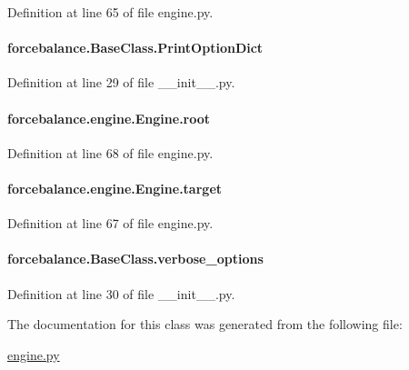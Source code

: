 Definition at line 65 of file engine.\-py.

\hypertarget{classforcebalance_1_1BaseClass_afc6659278497d7245bc492ecf405ccae}{
\paragraph[{Print\-Option\-Dict}]{\setlength{\rightskip}{0pt plus 5cm}forcebalance.\-Base\-Class.\-Print\-Option\-Dict\hspace{0.3cm}{\ttfamily [inherited]}}}\label{classforcebalance_1_1BaseClass_afc6659278497d7245bc492ecf405ccae}


Definition at line 29 of file \-\_\-\-\_\-init\-\_\-\-\_\-.\-py.

\hypertarget{classforcebalance_1_1engine_1_1Engine_a82e9382a3316d3e26ef29efb58db4a00}{
\paragraph[{root}]{\setlength{\rightskip}{0pt plus 5cm}forcebalance.\-engine.\-Engine.\-root}}\label{classforcebalance_1_1engine_1_1Engine_a82e9382a3316d3e26ef29efb58db4a00}


Definition at line 68 of file engine.\-py.

\hypertarget{classforcebalance_1_1engine_1_1Engine_a1fdd29fbd127cba331326a3557558e2a}{
\paragraph[{target}]{\setlength{\rightskip}{0pt plus 5cm}forcebalance.\-engine.\-Engine.\-target}}\label{classforcebalance_1_1engine_1_1Engine_a1fdd29fbd127cba331326a3557558e2a}


Definition at line 67 of file engine.\-py.

\hypertarget{classforcebalance_1_1BaseClass_afd68efa29ccd2f320f4cf82198214aac}{
\paragraph[{verbose\-\_\-options}]{\setlength{\rightskip}{0pt plus 5cm}forcebalance.\-Base\-Class.\-verbose\-\_\-options\hspace{0.3cm}{\ttfamily [inherited]}}}\label{classforcebalance_1_1BaseClass_afd68efa29ccd2f320f4cf82198214aac}


Definition at line 30 of file \-\_\-\-\_\-init\-\_\-\-\_\-.\-py.



The documentation for this class was generated from the following file\-:\begin{DoxyCompactItemize}
\item 
\hyperlink{engine_8py}{engine.\-py}\end{DoxyCompactItemize}
